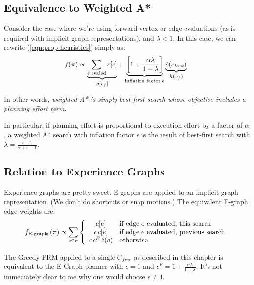 \documentclass{report}
\begin{document}
\subsection{Equivalence to Weighted A*}

Consider the case where we're using forward vertex or edge evaluations
(as is required with implicit graph representations),
and $\lambda < 1$.
In this case, we can rewrite (\ref{eqn:prop-heuristics})
simply as:
\begin{equation}
   f(\pi) \propto
   \underbrace{\sum_{e \; \mbox{\scriptsize evaled}} c[e]}_{g[v_f]}
   +
   \underbrace{\left[ 1 + \frac{\alpha \lambda}{1-\lambda} \right]}_{
      \mbox{\scriptsize inflation factor } \epsilon}
   \underbrace{\hat{c}(e_{last})}_{h(v_f)}
   .
\end{equation}

In other words,
\emph{weighted A* is simply best-first search whose objective
   includes a planning effort term.}

In particular, if planning effort is proportional to execution
effort by a factor of $\alpha$,
a weighted A* search with inflation factor $\epsilon$
is the result of best-first search with
$\lambda = \frac{\epsilon-1}{\alpha+\epsilon-1}$.

\subsection{Relation to Experience Graphs}
\label{sec:egraphs}

Experience graphs \cite{phillips2012egraphs} are pretty sweet.
E-graphs are applied to an implicit graph representation.
(We don't do shortcuts or snap motions.)
The equivalent E-graph edge weights are:
\begin{equation}
   f_{\mbox{\scriptsize E-graphs}}(\pi) \propto \sum_{e \in \pi} \left\{
   \begin{array}{cl}
      c[e] & \mbox{if edge } e \mbox{ evaluated, this search} \\
      \epsilon \, c[e] & \mbox{if edge } e \mbox{ evaluated, previous search} \\
     \epsilon \, \epsilon^E \, \hat{c}(e) & \mbox{otherwise} \\
   \end{array}
   \right.
   \label{eqn:prop-heuristics}
\end{equation}

The Greedy PRM applied to a single $C_{free}$ as described in this chapter
is equivalent to the E-Graph planner
with $\epsilon=1$ and $\epsilon^E = 1 + \frac{\alpha \lambda}{1-\lambda}$.
It's not immediately clear to me why one would choose $\epsilon \neq 1$.
\end{document}
